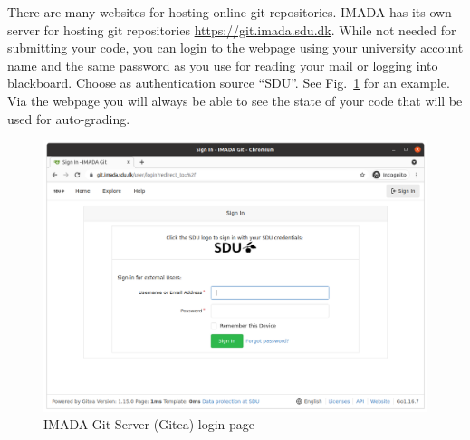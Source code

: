 There are many websites for hosting online git repositories. IMADA has its own server for hosting git repositories  \url{https://git.imada.sdu.dk}. While not needed for submitting your code, you can login to the webpage using your university account name and the same password as you use for reading your mail or logging into blackboard. Choose as authentication source ``SDU''. See Fig.~\ref{fig:gogs} for an example. Via the webpage you will always be able to see the state of your code that will be used for auto-grading.

\begin{figure}
  \includegraphics[width=\textwidth]{gitea_login}
  \caption{IMADA Git Server (Gitea) login page}
  \label{fig:gogs}
\end{figure}

